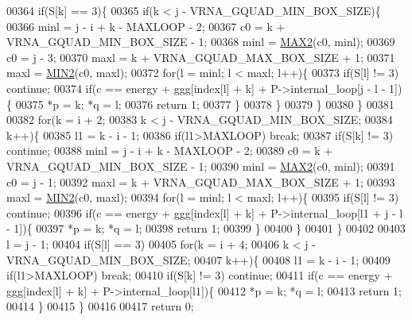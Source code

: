 \begin{DoxyCode}
00364   \textcolor{keywordflow}{if}(S[k] == 3)\{
00365     \textcolor{keywordflow}{if}(k < j - VRNA\_GQUAD\_MIN\_BOX\_SIZE)\{
00366       minl  = j - i + k - MAXLOOP - 2;
00367       c0    = k + VRNA\_GQUAD\_MIN\_BOX\_SIZE - 1;
00368       minl  = \hyperlink{group__utils_gadd91367918fadbc8d585940d6206d6d2}{MAX2}(c0, minl);
00369       c0    = j - 3;
00370       maxl  = k + VRNA\_GQUAD\_MAX\_BOX\_SIZE + 1;
00371       maxl  = \hyperlink{group__utils_ga2dd4a927a7f937f43a90c144d79107d8}{MIN2}(c0, maxl);
00372       \textcolor{keywordflow}{for}(l = minl; l < maxl; l++)\{
00373         \textcolor{keywordflow}{if}(S[l] != 3) \textcolor{keywordflow}{continue};
00374         \textcolor{keywordflow}{if}(c == energy + ggg[index[l] + k] + P->internal\_loop[j - l - 1])\{
00375           *p = k; *q = l;
00376           \textcolor{keywordflow}{return} 1;
00377         \}
00378       \}
00379     \}
00380   \}
00381 
00382   \textcolor{keywordflow}{for}(k = i + 2;
00383       k < j - VRNA\_GQUAD\_MIN\_BOX\_SIZE;
00384       k++)\{
00385     l1    = k - i - 1;
00386     \textcolor{keywordflow}{if}(l1>MAXLOOP) \textcolor{keywordflow}{break};
00387     \textcolor{keywordflow}{if}(S[k] != 3) \textcolor{keywordflow}{continue};
00388     minl  = j - i + k - MAXLOOP - 2;
00389     c0    = k + VRNA\_GQUAD\_MIN\_BOX\_SIZE - 1;
00390     minl  = \hyperlink{group__utils_gadd91367918fadbc8d585940d6206d6d2}{MAX2}(c0, minl);
00391     c0    = j - 1;
00392     maxl  = k + VRNA\_GQUAD\_MAX\_BOX\_SIZE + 1;
00393     maxl  = \hyperlink{group__utils_ga2dd4a927a7f937f43a90c144d79107d8}{MIN2}(c0, maxl);
00394     \textcolor{keywordflow}{for}(l = minl; l < maxl; l++)\{
00395       \textcolor{keywordflow}{if}(S[l] != 3) \textcolor{keywordflow}{continue};
00396       \textcolor{keywordflow}{if}(c == energy + ggg[index[l] + k] + P->internal\_loop[l1 + j - l - 1])\{
00397         *p = k; *q = l;
00398         \textcolor{keywordflow}{return} 1;
00399       \}
00400     \}
00401   \}
00402 
00403   l = j - 1;
00404   \textcolor{keywordflow}{if}(S[l] == 3)
00405     \textcolor{keywordflow}{for}(k = i + 4;
00406         k < j - VRNA\_GQUAD\_MIN\_BOX\_SIZE;
00407         k++)\{
00408       l1    = k - i - 1;
00409       \textcolor{keywordflow}{if}(l1>MAXLOOP) \textcolor{keywordflow}{break};
00410       \textcolor{keywordflow}{if}(S[k] != 3) \textcolor{keywordflow}{continue};
00411       \textcolor{keywordflow}{if}(c == energy + ggg[index[l] + k] + P->internal\_loop[l1])\{
00412         *p = k; *q = l;
00413         \textcolor{keywordflow}{return} 1;
00414       \}
00415     \}
00416 
00417   \textcolor{keywordflow}{return} 0;

\end{DoxyCode}
